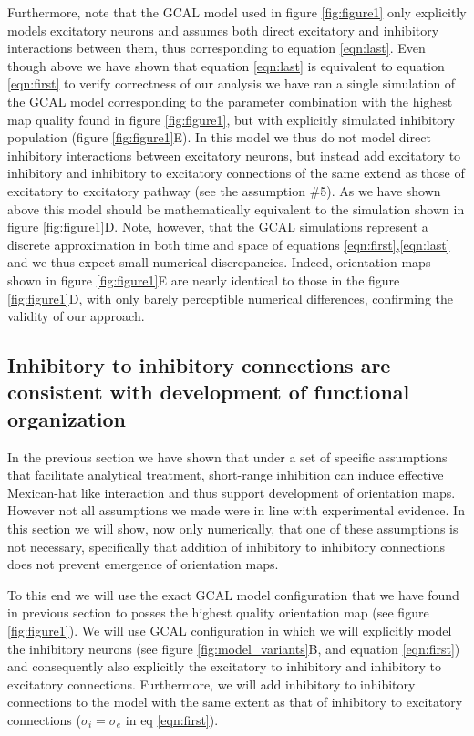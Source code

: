 \documentclass[utf8]{frontiersSCNS}
\begin{document}
Furthermore, note that the GCAL model used in figure \ref{fig:figure1} only explicitly models excitatory neurons and assumes both direct excitatory and inhibitory
interactions between them, thus corresponding to equation \ref{eqn:last}. Even though above we have shown that equation \ref{eqn:last} is equivalent to equation \ref{eqn:first} to verify 
correctness of our analysis we have ran a single simulation of the GCAL model corresponding to the parameter combination with the highest map 
quality found in figure \ref{fig:figure1}, but with explicitly simulated inhibitory population (figure \ref{fig:figure1}E). In this model we thus do not model direct inhibitory 
interactions between excitatory neurons, but instead add excitatory to inhibitory and inhibitory to excitatory connections of the same extend as those of excitatory to excitatory pathway (see the assumption \#5). 
As we have shown above this model should be mathematically equivalent to the simulation shown in figure \ref{fig:figure1}D. Note, however, that the GCAL simulations represent a discrete approximation 
in both time and space of equations \ref{eqn:first},\ref{eqn:last} and we thus expect small numerical discrepancies. Indeed, orientation maps shown in figure \ref{fig:figure1}E  are nearly identical to those 
in the figure \ref{fig:figure1}D, with only barely perceptible numerical differences, confirming the validity of our approach.


\subsection{Inhibitory to inhibitory connections are consistent with development of functional organization} \label{sec:SM2}

In the previous section we have shown that under a set of specific assumptions that facilitate analytical treatment, short-range inhibition can induce 
effective Mexican-hat like interaction and thus support development of orientation maps. However not all assumptions we 
made were in line with experimental evidence. In this section we will show, now only numerically, that one of these assumptions is not necessary, 
specifically that addition of inhibitory to inhibitory connections does not prevent emergence of orientation maps. 

To this end we will use the exact GCAL model configuration that we have found in previous section to posses the highest
quality orientation map (see figure \ref{fig:figure1}). We will use GCAL configuration in which we will explicitly model the inhibitory neurons
(see figure \ref{fig:model_variants}B, and equation \ref{eqn:first}) and consequently also explicitly the excitatory to inhibitory and inhibitory to excitatory connections.
Furthermore, we will add inhibitory to inhibitory connections to the model with the same extent as that of inhibitory to excitatory
connections ($\sigma_{i} = \sigma_{e}$ in eq \ref{eqn:first}). 
\end{document}
